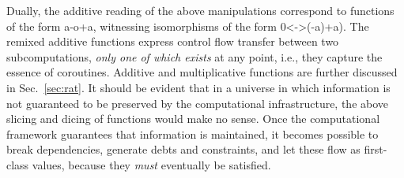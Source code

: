 \documentclass[preprint]{sigplanconf}
\begin{document}
Dually, the additive reading of the above manipulations correspond to
functions of the form {{a-o+a}}, witnessing isomorphisms of the form
{{0<->(-a)+a}}). The remixed additive functions express control flow transfer
between two subcomputations, \emph{only one of which exists} at any point,
i.e., they capture the essence of coroutines. Additive and multiplicative
functions are further discussed in Sec.~\ref{sec:rat}.  It should be evident
that in a universe in which information is not guaranteed to be preserved by
the computational infrastructure, the above slicing and dicing of functions
would make no sense. Once the computational framework guarantees that
information is maintained, it becomes possible to break dependencies,
generate debts and constraints, and let these flow as first-class values,
because they \emph{must} eventually be satisfied. 



\end{document}
